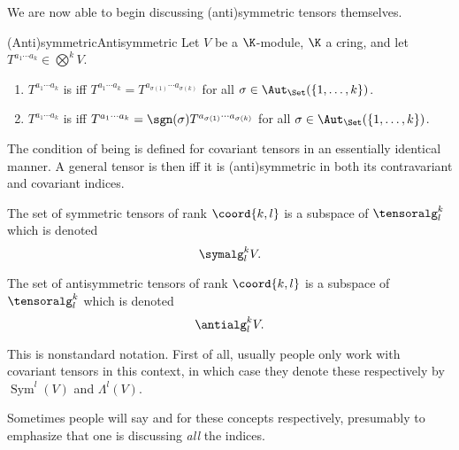 We are now able to begin discussing (anti)symmetric tensors themselves.
\begin{dfn}{(Anti)symmetric}{Antisymmetric}
	Let $V$ be a $\K$-module, $\K$ a cring, and let $T^{a_1\cdots a_k}\in \bigotimes ^kV$.
	\begin{enumerate}
		\item $T^{a_1\cdots a_k}$ is  iff $T^{a_1\cdots a_k}=T^{a_{\sigma (1)}\cdots a_{\sigma (k)}}$ for all $\sigma \in \Aut _{\Set}(\{ 1,\ldots ,k\} )$.
		\item $T^{a_1\cdots a_k}$ is  iff $T^{a_1\cdots a_k}=\sgn (\sigma )T^{a_{\sigma (1)}\cdots a_{\sigma (k)}}$ for all $\sigma \in \Aut _{\Set}(\{ 1,\ldots ,k\} )$.
	\end{enumerate}
	\begin{rmk}
		The condition of being  is defined for covariant tensors in an essentially identical manner.  A general tensor is then  iff it is (anti)symmetric in both its contravariant and covariant indices.
	\end{rmk}
	\begin{rmk}
		The set of symmetric tensors of rank $\coord{k,l}$ is a subspace of $\tensoralg _l^k$ which is denoted
		\begin{equation}
			\symalg _l^kV.
		\end{equation}\index[notation]{$\symalg _l^kV$}
		
		The set of antisymmetric tensors of rank $\coord{k,l}$ is a subspace of $\tensoralg _l^k$ which is denoted
		\begin{equation}
		\antialg _l^kV.
		\end{equation}\index[notation]{$\antialg _l^kV$}
	\end{rmk}
	\begin{rmk}
		This is nonstandard notation.  First of all, usually people only work with covariant tensors in this context, in which case they denote these respectively by $\operatorname{Sym}^l(V)$ and $\Lambda ^l(V)$\index[notation]{$\Lambda ^l(V)$}.
	\end{rmk}
	\begin{rmk}
		Sometimes people will say  and  for these concepts respectively, presumably to emphasize that one is discussing \emph{all} the indices.
	\end{rmk}
\end{dfn}
